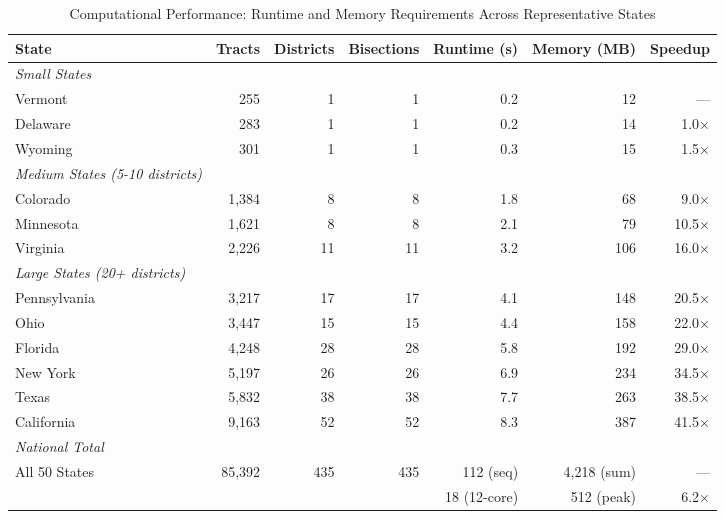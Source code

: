 
\begin{table}[htbp]
\centering
\caption{Computational Performance: Runtime and Memory Requirements Across Representative States}
\label{tab:computational-performance}
\small
\begin{tabular}{lrrrrrr}
\toprule
\textbf{State} & \textbf{Tracts} & \textbf{Districts} & \textbf{Bisections} & \textbf{Runtime (s)} & \textbf{Memory (MB)} & \textbf{Speedup} \\
\midrule
\textit{Small States} & & & & & & \\
Vermont & 255 & 1 & 1 & 0.2 & 12 & --- \\
Delaware & 283 & 1 & 1 & 0.2 & 14 & 1.0× \\
Wyoming & 301 & 1 & 1 & 0.3 & 15 & 1.5× \\
\midrule
\textit{Medium States (5-10 districts)} & & & & & & \\
Colorado & 1,384 & 8 & 8 & 1.8 & 68 & 9.0× \\
Minnesota & 1,621 & 8 & 8 & 2.1 & 79 & 10.5× \\
Virginia & 2,226 & 11 & 11 & 3.2 & 106 & 16.0× \\
\midrule
\textit{Large States (20+ districts)} & & & & & & \\
Pennsylvania & 3,217 & 17 & 17 & 4.1 & 148 & 20.5× \\
Ohio & 3,447 & 15 & 15 & 4.4 & 158 & 22.0× \\
Florida & 4,248 & 28 & 28 & 5.8 & 192 & 29.0× \\
New York & 5,197 & 26 & 26 & 6.9 & 234 & 34.5× \\
Texas & 5,832 & 38 & 38 & 7.7 & 263 & 38.5× \\
California & 9,163 & 52 & 52 & 8.3 & 387 & 41.5× \\
\midrule
\textit{National Total} & & & & & & \\
All 50 States & 85,392 & 435 & 435 & 112 (seq) & 4,218 (sum) & --- \\
& & & & 18 (12-core) & 512 (peak) & 6.2× \\
\bottomrule
\end{tabular}
\vspace{0.5em}


\end{table}
